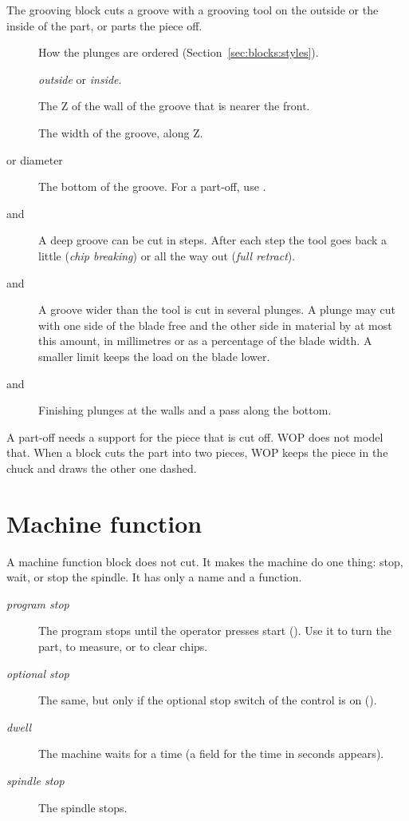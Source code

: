 The grooving block cuts a groove with a grooving tool on the outside or the inside of the part, or parts the piece off.

\begin{description}
\item[] How the plunges are ordered (Section~\ref{sec:blocks:styles}).
\item[] \emph{outside} or \emph{inside}.
\item[] The Z of the wall of the groove that is nearer the front.
\item[] The width of the groove, along Z.
\item[ or diameter] The bottom of the groove. For a part-off, use .
\item[ and ] A deep groove can be cut in steps. After each step the tool goes back a little (\emph{chip breaking}) or all the way out (\emph{full retract}).
\item[ and ] A groove wider than the tool is cut in several plunges. A plunge may cut with one side of the blade free and the other side in material by at most this amount, in millimetres or as a percentage of the blade width. A smaller limit keeps the load on the blade lower.
\item[ and ] Finishing plunges at the walls and a pass along the bottom.
\end{description}

\begin{notebox}
A part-off needs a support for the piece that is cut off. WOP does not model that. When a block cuts the part into two pieces, WOP keeps the piece in the chuck and draws the other one dashed.
\end{notebox}

\section{Machine function}\label{sec:blocks:function}


A machine function block does not cut. It makes the machine do one thing: stop, wait, or stop the spindle. It has only a name and a function.

\begin{description}
\item[\emph{program stop}] The program stops until the operator presses start (). Use it to turn the part, to measure, or to clear chips.
\item[\emph{optional stop}] The same, but only if the optional stop switch of the control is on ().
\item[\emph{dwell}] The machine waits for a time (a field for the time in seconds appears).
\item[\emph{spindle stop}] The spindle stops.
\end{description}

